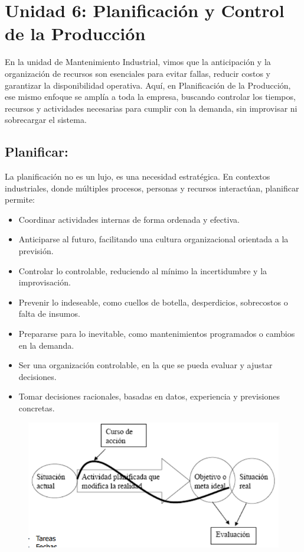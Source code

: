 \documentclass[a4paper,oneside,11pt]{article}
\begin{document}
\clearpage

\section{Unidad 6: Planificación y Control de la Producción}

En la unidad de Mantenimiento Industrial, vimos que la anticipación y la organización de recursos son esenciales para evitar fallas, reducir costos y garantizar la disponibilidad operativa.
Aquí, en Planificación de la Producción, ese mismo enfoque se amplía a toda la empresa, buscando controlar los tiempos, recursos y actividades necesarias para cumplir con la demanda, sin improvisar ni sobrecargar el sistema.

\subsection{Planificar:}
La planificación no es un lujo, es una necesidad estratégica. En contextos industriales, donde múltiples procesos, personas y recursos interactúan, planificar permite:

\begin{itemize}
    \item Coordinar actividades internas de forma ordenada y efectiva.
    \item Anticiparse al futuro, facilitando una cultura organizacional orientada a la previsión.
    \item Controlar lo controlable, reduciendo al mínimo la incertidumbre y la improvisación.
    \item Prevenir lo indeseable, como cuellos de botella, desperdicios, sobrecostos o falta de insumos.
    \item Prepararse para lo inevitable, como mantenimientos programados o cambios en la demanda.
    \item Ser una organización controlable, en la que se pueda evaluar y ajustar decisiones.
    \item Tomar decisiones racionales, basadas en datos, experiencia y previsiones concretas.
\end{itemize}



\begin{figure} [ht!]
    \centering
    \includegraphics[scale=1]{planificar.png}
\end{figure}
\end{document}
